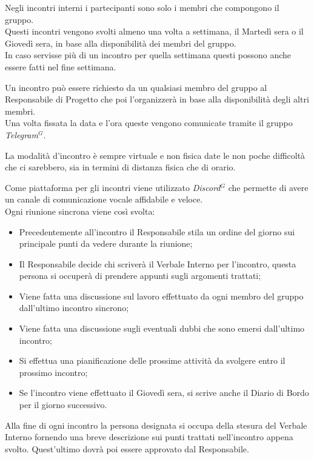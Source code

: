             Negli incontri interni i partecipanti sono solo i membri che compongono il gruppo. \\
            Questi incontri vengono svolti almeno una volta a settimana, il Martedì sera o il Giovedì sera, in base alla disponibilità dei membri del gruppo. \\
            In caso servisse più di un incontro per quella settimana questi possono anche essere fatti nel fine settimana.

            Un incontro può essere richiesto da un qualsiasi membro del gruppo al Responsabile di Progetto che poi l'organizzerà in base alla disponibilità degli altri membri. \\
            Una volta fissata la data e l'ora queste vengono comunicate tramite il gruppo \emph{Telegram}$^{G}$.

            La modalità d'incontro è sempre virtuale e non fisica date le non poche difficoltà che ci sarebbero, sia in termini di distanza fisica che di orario.

            Come piattaforma per gli incontri viene utilizzato \emph{Discord}$^{G}$ che permette di avere un canale di comunicazione vocale affidabile e veloce.\\

            Ogni riunione sincrona viene così svolta:
            \begin{itemize}
                \item Precedentemente all'incontro il Responsabile stila un ordine del giorno sui principale punti da vedere durante la riunione;
                \item Il Responsabile decide chi scriverà il Verbale Interno per l'incontro, questa persona si occuperà di prendere appunti sugli argomenti trattati;
                \item Viene fatta una discussione sul lavoro effettuato da ogni membro del gruppo dall'ultimo incontro sincrono;
                \item Viene fatta una discussione sugli eventuali dubbi che sono emersi dall'ultimo incontro;
                \item Si effettua una pianificazione delle prossime attività da svolgere entro il prossimo incontro;
                \item Se l'incontro viene effettuato il Giovedì sera, si scrive anche il Diario di Bordo per il giorno successivo.
            \end{itemize}

            Alla fine di ogni incontro la persona designata si occupa della stesura del Verbale Interno fornendo una breve descrizione sui punti trattati nell'incontro appena svolto.
            Quest'ultimo dovrà poi essere approvato dal Responsabile.


